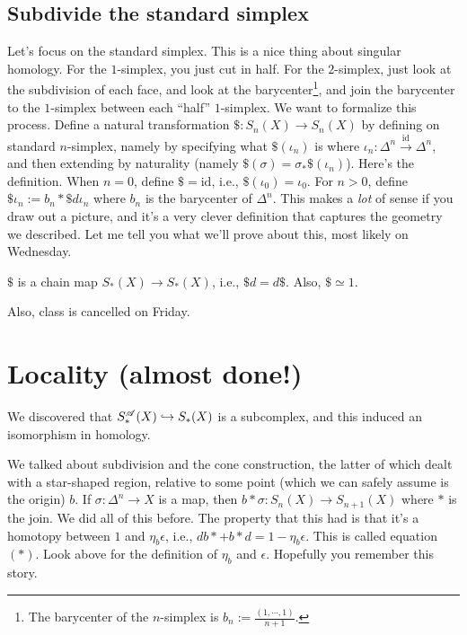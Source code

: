 \subsection{Subdivide the standard simplex}
Let's focus on the standard simplex. This is a nice thing about singular homology. For the $1$-simplex, you just cut in half. For the $2$-simplex, just look at the subdivision of each face, and look at the barycenter\footnote{The barycenter of the $n$-simplex is $b_n:=\frac{(1,\cdots,1)}{n+1}$.}, and join the barycenter to the $1$-simplex between each ``half'' $1$-simplex. We want to formalize this process. Define a natural transformation $\$:S_n(X)\to S_n(X)$ by defining on standard $n$-simplex, namely by specifying what $\$(\iota_n)$ is where $\iota_n:\Delta^n\xrightarrow{\mathrm{id}}\Delta^n$, and then extending by naturality (namely $\$(\sigma)=\sigma_\ast\$(\iota_n)$). Here's the definition. When $n=0$, define $\$=\mathrm{id}$, i.e., $\$(\iota_0)=\iota_0$. For $n>0$, define $\$\iota_n:=b_n\ast\$ d\iota_n$ where $b_n$ is the barycenter of $\Delta^n$. This makes a \emph{lot} of sense if you draw out a picture, and it's a very clever definition that captures the geometry we described. Let me tell you what we'll prove about this, most likely on Wednesday.
\begin{prop}
$\$$ is a chain map $S_\ast(X)\to S_\ast(X)$, i.e., $\$d=d\$$. Also, $\$\simeq 1$.
\end{prop}
Also, class is cancelled on Friday.
\section{Locality (almost done!)}
\begin{theorem}
We discovered that $S^{\mathscr{A}}_\ast(X)\hookrightarrow S_\ast(X)$ is a subcomplex, and this induced an isomorphism in homology.
\end{theorem}
We talked about subdivision and the cone construction, the latter of which dealt with a star-shaped region, relative to some point (which we can safely assume is the origin) $b$. If $\sigma:\Delta^n\to X$ is a map, then $b\ast \sigma:S_n(X)\to S_{n+1}(X)$ where $\ast$ is the join. We did all of this before. The property that this had is that it's a homotopy between $1$ and $\eta_b\epsilon$, i.e., $db\ast + b\ast d = 1-\eta_b\epsilon$. This is called equation $(\ast)$. Look above for the definition of $\eta_b$ and $\epsilon$. Hopefully you remember this story.

